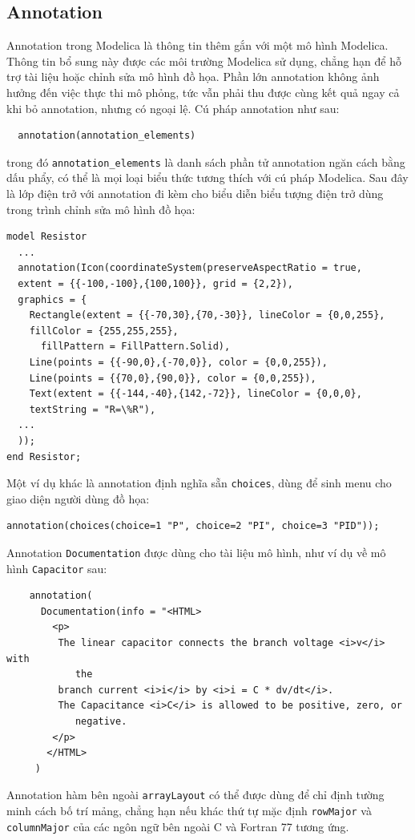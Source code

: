 \subsection{Annotation}
Annotation trong Modelica là thông tin thêm gắn với một mô hình Modelica. Thông tin bổ sung này được các môi trường Modelica sử dụng, chẳng hạn để hỗ trợ tài liệu hoặc chỉnh sửa mô hình đồ họa. Phần lớn annotation không ảnh hưởng đến việc thực thi mô phỏng, tức vẫn phải thu được cùng kết quả ngay cả khi bỏ annotation, nhưng có ngoại lệ. Cú pháp annotation như sau:
\begin{verbatim}
  annotation(annotation_elements)
\end{verbatim}
trong đó \texttt{annotation\_elements} là danh sách phần tử annotation ngăn cách bằng dấu phẩy, có thể là mọi loại biểu thức tương thích với cú pháp Modelica. Sau đây là lớp điện trở với annotation đi kèm cho biểu diễn biểu tượng điện trở dùng trong trình chỉnh sửa mô hình đồ họa:
\begin{verbatim}
model Resistor
  ...
  annotation(Icon(coordinateSystem(preserveAspectRatio = true,
  extent = {{-100,-100},{100,100}}, grid = {2,2}),
  graphics = {
    Rectangle(extent = {{-70,30},{70,-30}}, lineColor = {0,0,255},
    fillColor = {255,255,255},
      fillPattern = FillPattern.Solid),
    Line(points = {{-90,0},{-70,0}}, color = {0,0,255}),
    Line(points = {{70,0},{90,0}}, color = {0,0,255}),
    Text(extent = {{-144,-40},{142,-72}}, lineColor = {0,0,0},
    textString = "R=\%R"),
  ...
  ));
end Resistor;
\end{verbatim}
Một ví dụ khác là annotation định nghĩa sẵn \texttt{choices}, dùng để sinh menu cho giao diện người dùng đồ họa:
\begin{verbatim}
annotation(choices(choice=1 "P", choice=2 "PI", choice=3 "PID"));
\end{verbatim}
Annotation \texttt{Documentation} được dùng cho tài liệu mô hình, như ví dụ về mô hình \texttt{Capacitor} sau:
\begin{verbatim}
    annotation(
      Documentation(info = "<HTML>
        <p>
         The linear capacitor connects the branch voltage <i>v</i> with
            the
         branch current <i>i</i> by <i>i = C * dv/dt</i>.
         The Capacitance <i>C</i> is allowed to be positive, zero, or
            negative.
        </p>
       </HTML>
     )
\end{verbatim}
Annotation hàm bên ngoài \texttt{arrayLayout} có thể được dùng để chỉ định tường minh cách bố trí mảng, chẳng hạn nếu khác thứ tự mặc định \texttt{rowMajor} và \texttt{columnMajor} của các ngôn ngữ bên ngoài C và Fortran 77 tương ứng.


